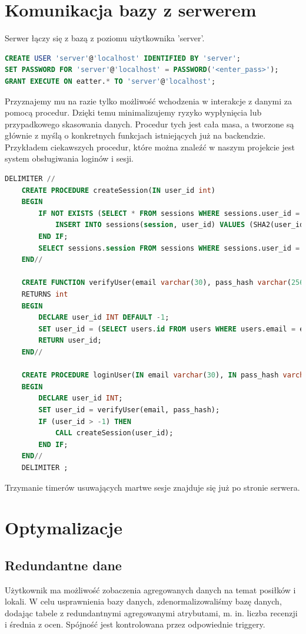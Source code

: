 \documentclass{report}
\begin{document}
\section*{Komunikacja bazy z serwerem}
Serwer łączy się z bazą z poziomu użytkownika 'server'.
\begin{lstlisting}[language=SQL]
CREATE USER 'server'@'localhost' IDENTIFIED BY 'server';
SET PASSWORD FOR 'server'@'localhost' = PASSWORD('<enter_pass>');
GRANT EXECUTE ON eatter.* TO 'server'@'localhost';
\end{lstlisting}
Przyznajemy mu na razie tylko możliwość wchodzenia w interakcje z danymi
za pomocą procedur. Dzięki temu minimalizujemy ryzyko wypłynięcia lub
przypadkowego skasowania danych. Procedur tych jest cała masa, a tworzone
są głównie z myślą o konkretnych funkcjach istniejących już na backendzie.
Przykładem ciekawszych procedur, które można znaleźć w naszym projekcie
jest system obsługiwania loginów i sesji.
\\
\begin{lstlisting}[language=SQL]
    DELIMITER //
    CREATE PROCEDURE createSession(IN user_id int)
    BEGIN
        IF NOT EXISTS (SELECT * FROM sessions WHERE sessions.user_id = user_id) THEN
            INSERT INTO sessions(session, user_id) VALUES (SHA2(user_id, 256), user_id);
        END IF;
        SELECT sessions.session FROM sessions WHERE sessions.user_id = user_id;
    END//

    CREATE FUNCTION verifyUser(email varchar(30), pass_hash varchar(256))
    RETURNS int
    BEGIN
        DECLARE user_id INT DEFAULT -1;
        SET user_id = (SELECT users.id FROM users WHERE users.email = email AND users.pass_hash = pass_hash);
        RETURN user_id;
    END//

    CREATE PROCEDURE loginUser(IN email varchar(30), IN pass_hash varchar(256))
    BEGIN
        DECLARE user_id INT;
        SET user_id = verifyUser(email, pass_hash);
        IF (user_id > -1) THEN
            CALL createSession(user_id);
        END IF;
    END//
    DELIMITER ;
\end{lstlisting}
Trzymanie timerów usuwających martwe sesje znajduje się już po stronie
serwera.
\section*{Optymalizacje}
\subsection*{Redundantne dane}
Użytkownik ma możliwość zobaczenia agregowanych danych 
na temat posiłków i lokali. W celu usprawnienia bazy danych,
zdenormalizowaliśmy bazę danych, dodając tabele z 
redundantnymi agregowanymi atrybutami, m. in. liczba recenzji
i średnia z ocen. Spójność jest kontrolowana przez odpowiednie triggery.
\end{document}
